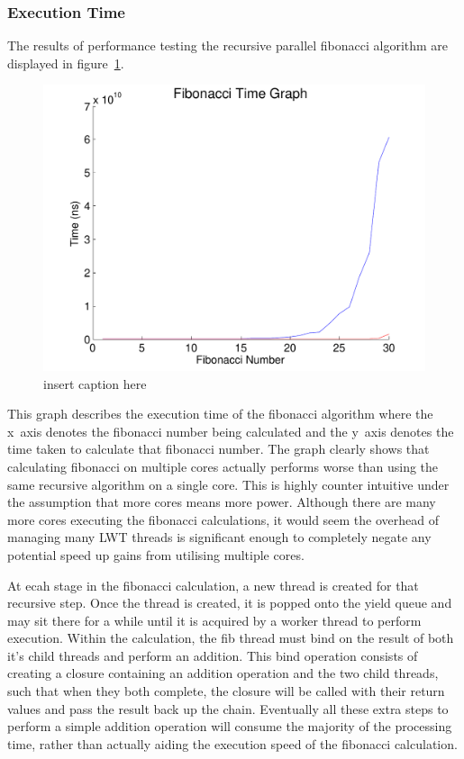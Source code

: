 \documentclass[12pt,twoside,notitlepage]{report}
\begin{document}
\subsubsection{Execution Time}
The results of performance testing the recursive parallel fibonacci algorithm are displayed in figure~\ref{fig:fib_time_graph}.
\begin{figure}[h!]
\includegraphics[width=\linewidth]{fib_time_graph}
\caption{insert caption here}
\label{fig:fib_time_graph}
\end{figure}
This graph describes the execution time of the fibonacci algorithm where the x~axis denotes the fibonacci number being calculated and the y~axis denotes the time taken to calculate that fibonacci number. The graph clearly shows that
calculating fibonacci on multiple cores actually performs worse than using the same recursive algorithm on a single core. This is highly counter intuitive under the assumption that more cores means more power. Although there are many
more cores executing the fibonacci calculations, it would seem the overhead of managing many LWT threads is significant enough to completely negate any potential speed up gains from utilising multiple cores.

%
%
At ecah stage in the fibonacci calculation, a new thread is created for that recursive step. Once the thread is created, it is popped onto the yield queue and may sit there for a while until it is acquired by a worker thread to
perform execution. Within the calculation, the fib thread must bind on the result of both it's child threads and perform an addition. This bind operation consists of creating a closure containing an addition operation and the two
child threads, such that when they both complete, the closure will be called with their return values and pass the result back up the chain. Eventually all these extra steps to perform a simple addition operation will consume the
majority of the processing time, rather than actually aiding the execution speed of the fibonacci calculation. 
\end{document}
